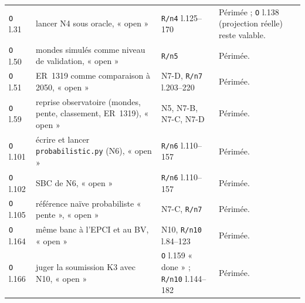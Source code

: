 {\begin{longtable}{@{}>{\raggedright\arraybackslash}p{2.6cm}>{\raggedright\arraybackslash}p{3.6cm}>{\raggedright\arraybackslash}p{3.6cm}>{\raggedright\arraybackslash}p{5.2cm}@{}}
\texttt{O} l.31 & lancer N4 sous oracle, « open » & \texttt{R/n4} l.125--170 &
Périmée ; \texttt{O} l.138 (projection réelle) reste valable. \\
\texttt{O} l.50 & mondes simulés comme niveau de validation, « open » & \texttt{R/n5} &
Périmée. \\
\texttt{O} l.51 & ER~1319 comme comparaison à 2050, « open » & N7-D, \texttt{R/n7} l.203--220 &
Périmée. \\
\texttt{O} l.59 & reprise observatoire (mondes, pente, classement, ER~1319), « open » &
N5, N7-B, N7-C, N7-D & Périmée. \\
\texttt{O} l.101 & écrire et lancer \texttt{probabilistic.py} (N6), « open » &
\texttt{R/n6} l.110--157 & Périmée. \\
\texttt{O} l.102 & SBC de N6, « open » & \texttt{R/n6} l.110--157 & Périmée. \\
\texttt{O} l.105 & référence naïve probabiliste « pente », « open » & N7-C, \texttt{R/n7} &
Périmée. \\
\texttt{O} l.164 & même banc à l'EPCI et au BV, « open » & N10, \texttt{R/n10} l.84--123 &
Périmée. \\
\texttt{O} l.166 & juger la soumission K3 avec N10, « open » &
\texttt{O} l.159 « done » ; \texttt{R/n10} l.144--182 & Périmée. \\
\end{longtable}
}
\endgroup
